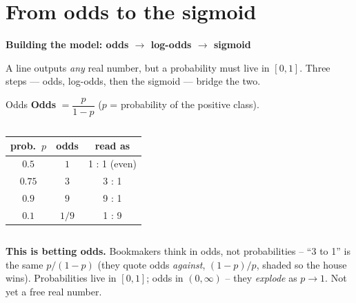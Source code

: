 \documentclass[aspectratio=169]{beamer}
\begin{document}
\section{From odds to the sigmoid}

\begin{frame}[plain]
  \vfill
  \begin{center}
    {\Large\color{popblue}\textbf{Building the model: odds $\to$ log-odds $\to$ sigmoid}}\\[0.9em]
    \begin{minipage}{0.82\textwidth}\centering\small
      A line outputs \emph{any} real number, but a probability must live in $[0,1]$.
      Three steps --- odds, log-odds, then the sigmoid --- bridge the two.
    \end{minipage}
  \end{center}
  \vfill
\end{frame}

\begin{frame}{Odds}
  \textbf{Odds} $= \dfrac{p}{1-p}$ \quad($p$ = probability of the positive class).
  \begin{columns}[T]
    \begin{center}\small
      \renewcommand{\arraystretch}{1.3}
      \begin{tabular}{c c c}
        prob.\ $p$ & odds & read as \\
        \hline
        $0.5$ & $1$ & 1 : 1 (even) \\
        $0.75$ & $3$ & 3 : 1 \\
        $0.9$ & $9$ & 9 : 1 \\
        $0.1$ & $1/9$ & 1 : 9 \\
        \hline
      \end{tabular}
    \end{center}
    \begin{center}
    \end{center}
  \end{columns}
  \vskip 2pt
  \footnotesize \textbf{This is betting odds.} Bookmakers think in odds, not
  probabilities -- ``3 to 1'' is the same $p/(1-p)$ (they quote odds \emph{against},
  $(1-p)/p$, shaded so the house wins). Probabilities live in $[0,1]$; odds in
  $(0,\infty)$ -- they \emph{explode} as $p\to 1$. Not yet a free real number.
\end{frame}
\end{document}
